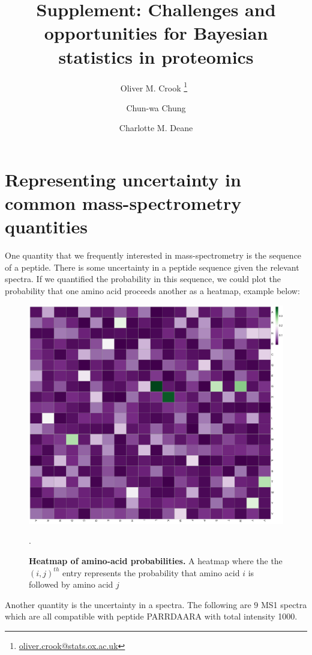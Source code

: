 \documentclass[12pt,english, journal=jpr, layout=twocolumn]{article}
\title{Supplement: Challenges and opportunities for Bayesian statistics in proteomics}
\author[1]{Oliver M. Crook \thanks{\url{oliver.crook@stats.ox.ac.uk}}~}
\author[2]{Chun-wa Chung}
\author[1]{Charlotte M. Deane}
\begin{document}
	
\section{Representing uncertainty in common mass-spectrometry quantities}
One quantity that we frequently interested in mass-spectrometry is the sequence of a peptide. There is some uncertainty in a peptide sequence given the relevant spectra. If we quantified the probability in this sequence, we could plot the probability that one amino acid proceeds another as a heatmap, example below:

\begin{figure}[H]
	\centering
	\includegraphics[width =1\textwidth]{probabilityaminoacids.pdf}
	\caption{\textbf{Heatmap of amino-acid probabilities.} A heatmap where the the $(i,j)^{th}$ entry represents the probability that amino acid $i$ is followed by amino acid $j$}.
	\label{figure::figure1aa}
\end{figure}

Another quantity is the uncertainty in a spectra. The following are $9$ MS1 spectra which are all compatible with peptide PARRDAARA with total intensity 1000.
	
\end{document}
